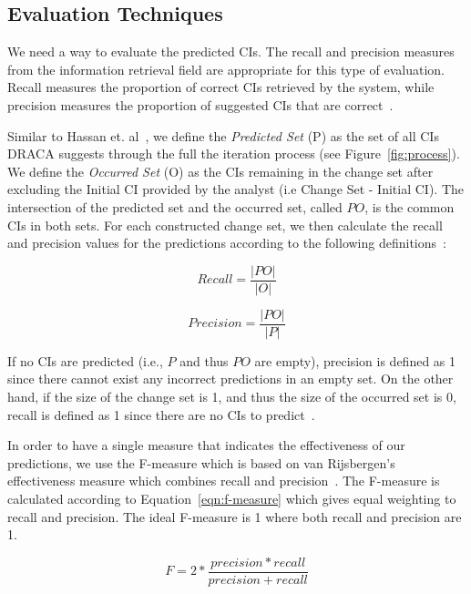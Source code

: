 \documentclass{article}
\begin{document}
\subsection{Evaluation Techniques}

We need a way to evaluate the predicted CIs. The recall and precision measures from the information retrieval field are appropriate for this type of evaluation.
Recall measures the proportion of correct CIs retrieved by the system, while precision measures the proportion of suggested CIs that are correct~\cite{van79}.

Similar to Hassan et. al~\cite{hassan2004predicting}, we define the \textit{Predicted Set} (P) as the set of all CIs DRACA suggests through the full the
iteration process (see Figure~\ref{fig:process}). We define the \textit{Occurred Set} (O) as the CIs remaining in the change set after excluding the Initial CI
provided by the analyst (i.e Change Set - Initial CI). The intersection of the predicted set and the occurred set, called $PO$, is the common CIs in both sets.
For each constructed change set, we then calculate the recall and precision values for the predictions according to the following
definitions~\cite{hassan2004predicting}:

\begin{equation}
\label{eqn:recall}
Recall = \frac{|PO|}{|O|}
\end{equation}

\begin{equation}
\label{eqn:precision}
Precision = \frac{|PO|}{|P|}
\end{equation}

If no CIs are predicted (i.e., $P$ and thus $PO$ are empty), precision is defined as 1 since there cannot exist any incorrect predictions in an empty set. On
the other hand, if the size of the change set is 1, and thus the size of the occurred set is 0, recall is defined as 1 since there are no CIs to
predict~\cite{hassan2004predicting}.  

In order to have a single measure that indicates the effectiveness of our predictions, we use the F-measure which is based on van Rijsbergen's effectiveness
measure which combines recall and precision~\cite{van79}. The F-measure is calculated according to Equation~\ref{eqn:f-measure} which gives equal weighting to
recall and precision. The ideal F-measure is 1 where both recall and precision are 1.

\begin{equation}
F = 2 * \frac{precision * recall}{precision +recall}
\label{eqn:f-measure}
\end{equation}
\end{document}
